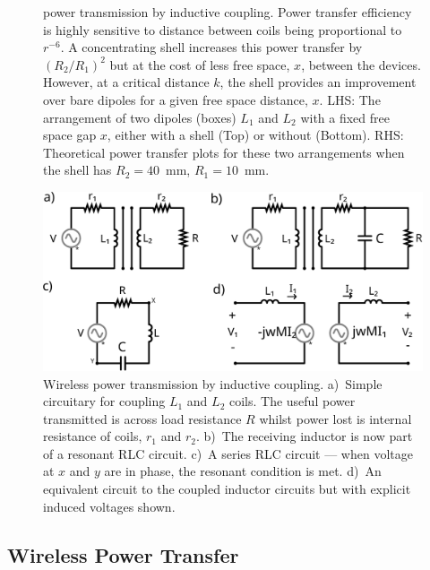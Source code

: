 \documentclass[11pt]{iopart}
\begin{document}
\begin{figure}
{    power transmission by inductive coupling. Power transfer efficiency is highly sensitive
    to distance between coils being proportional to $r^{-6}$. A
    concentrating shell increases this power transfer by $(R_2/R_1)^2$
    but at the cost of less free space, $x$, between the
    devices. However, at a critical distance $k$, the shell provides
    an improvement over bare dipoles for a given free space distance,
    $x$. LHS: The arrangement of two dipoles (boxes) $L_1$ and $L_2$
    with a fixed free space gap $x$, either with a shell (Top) or
    without (Bottom). RHS: Theoretical power transfer plots for these
    two arrangements when the shell has $R_2 = 40$~mm, $R_1 =
    10$~mm.}\label{fig:d_motiv}
\end{figure}

\begin{figure}
  \begin{center}
   \noindent\includegraphics[width=0.65\linewidth]{images/WPT.pdf}
  \end{center}
  \caption{Wireless power transmission by inductive
    coupling. a)~Simple circuitary for coupling $L_1$ and $L_2$
    coils. The useful power transmitted is across load resistance $R$
    whilst power lost is internal resistance of coils, $r_1$ and
    $r_2$. b)~The receiving inductor is now part of a resonant RLC
    circuit. c)~A series RLC circuit --- when voltage at $x$ and $y$
    are in phase, the resonant condition is met. d)~An equivalent
    circuit to the coupled inductor circuits but with explicit induced
    voltages shown. }\label{fig:WPT}
\end{figure}

\subsection{Wireless Power Transfer}
\end{document}
